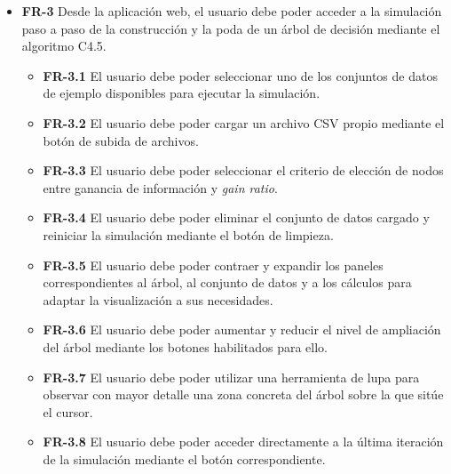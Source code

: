 \begin{itemize}
\begin{itemize}
    \item \textbf{FR-2.12} En el apartado de elección de nodo, la aplicación debe mostrar mediante una representación gráfica el nodo seleccionado a partir de la tabla generada.

    \item \textbf{FR-2.13} La aplicación debe mostrar una leyenda bajo la representación gráfica del nodo elegido, explicando aspectos como el significado de las hojas definitivas y las condiciones asociadas a las ramas.
\end{itemize}

\item \textbf{FR-3} Desde la aplicación web, el usuario debe poder acceder a la simulación paso a paso de la construcción y la poda de un árbol de decisión mediante el algoritmo C4.5.

\begin{itemize}
    \item \textbf{FR-3.1} El usuario debe poder seleccionar uno de los conjuntos de datos de ejemplo disponibles para ejecutar la simulación.

    \item \textbf{FR-3.2} El usuario debe poder cargar un archivo CSV propio mediante el botón de subida de archivos.

    \item \textbf{FR-3.3} El usuario debe poder seleccionar el criterio de elección de nodos entre ganancia de información y \textit{gain ratio}.

    \item \textbf{FR-3.4} El usuario debe poder eliminar el conjunto de datos cargado y reiniciar la simulación mediante el botón de limpieza.

    \item \textbf{FR-3.5} El usuario debe poder contraer y expandir los paneles correspondientes al árbol, al conjunto de datos y a los cálculos para adaptar la visualización a sus necesidades.

    \item \textbf{FR-3.6} El usuario debe poder aumentar y reducir el nivel de ampliación del árbol mediante los botones habilitados para ello.

    \item \textbf{FR-3.7} El usuario debe poder utilizar una herramienta de lupa para observar con mayor detalle una zona concreta del árbol sobre la que sitúe el cursor.

    \item \textbf{FR-3.8} El usuario debe poder acceder directamente a la última iteración de la simulación mediante el botón correspondiente.


\end{itemize}
\end{itemize}
